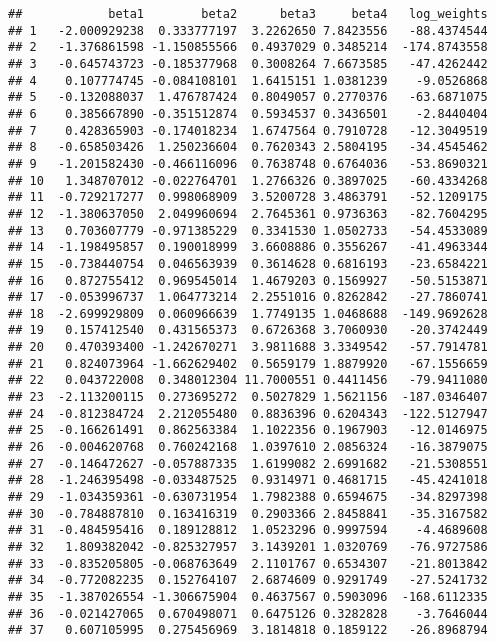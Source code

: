 \documentclass[
]{article}
\begin{document}
\begin{verbatim}
##            beta1        beta2      beta3     beta4   log_weights
## 1   -2.000929238  0.333777197  3.2262650 7.8423556   -88.4374544
## 2   -1.376861598 -1.150855566  0.4937029 0.3485214  -174.8743558
## 3   -0.645743723 -0.185377968  0.3008264 7.6673585   -47.4262442
## 4    0.107774745 -0.084108101  1.6415151 1.0381239    -9.0526868
## 5   -0.132088037  1.476787424  0.8049057 0.2770376   -63.6871075
## 6    0.385667890 -0.351512874  0.5934537 0.3436501    -2.8440404
## 7    0.428365903 -0.174018234  1.6747564 0.7910728   -12.3049519
## 8   -0.658503426  1.250236604  0.7620343 2.5804195   -34.4545462
## 9   -1.201582430 -0.466116096  0.7638748 0.6764036   -53.8690321
## 10   1.348707012 -0.022764701  1.2766326 0.3897025   -60.4334268
## 11  -0.729217277  0.998068909  3.5200728 3.4863791   -52.1209175
## 12  -1.380637050  2.049960694  2.7645361 0.9736363   -82.7604295
## 13   0.703607779 -0.971385229  0.3341530 1.0502733   -54.4533089
## 14  -1.198495857  0.190018999  3.6608886 0.3556267   -41.4963344
## 15  -0.738440754  0.046563939  0.3614628 0.6816193   -23.6584221
## 16   0.872755412  0.969545014  1.4679203 0.1569927   -50.5153871
## 17  -0.053996737  1.064773214  2.2551016 0.8262842   -27.7860741
## 18  -2.699929809  0.060966639  1.7749135 1.0468688  -149.9692628
## 19   0.157412540  0.431565373  0.6726368 3.7060930   -20.3742449
## 20   0.470393400 -1.242670271  3.9811688 3.3349542   -57.7914781
## 21   0.824073964 -1.662629402  0.5659179 1.8879920   -67.1556659
## 22   0.043722008  0.348012304 11.7000551 0.4411456   -79.9411080
## 23  -2.113200115  0.273695272  0.5027829 1.5621156  -187.0346407
## 24  -0.812384724  2.212055480  0.8836396 0.6204343  -122.5127947
## 25  -0.166261491  0.862563384  1.1022356 0.1967903   -12.0146975
## 26  -0.004620768  0.760242168  1.0397610 2.0856324   -16.3879075
## 27  -0.146472627 -0.057887335  1.6199082 2.6991682   -21.5308551
## 28  -1.246395498 -0.033487525  0.9314971 0.4681715   -45.4241018
## 29  -1.034359361 -0.630731954  1.7982388 0.6594675   -34.8297398
## 30  -0.784887810  0.163416319  0.2903366 2.8458841   -35.3167582
## 31  -0.484595416  0.189128812  1.0523296 0.9997594    -4.4689608
## 32   1.809382042 -0.825327957  3.1439201 1.0320769   -76.9727586
## 33  -0.835205805 -0.068763649  2.1101767 0.6534307   -21.8013842
## 34  -0.772082235  0.152764107  2.6874609 0.9291749   -27.5241732
## 35  -1.387026554 -1.306675904  0.4637567 0.5903096  -168.6112335
## 36  -0.021427065  0.670498071  0.6475126 0.3282828    -3.7646044
## 37   0.607105995  0.275456969  3.1814818 0.1859122   -26.8968794

\end{verbatim}
\end{document}

